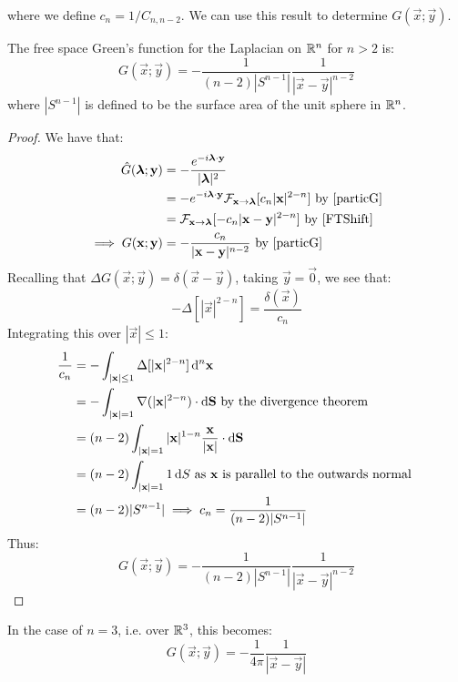 \documentclass[../main.tex]{subfiles}
\begin{document}
where we define $c_n = 1/C_{n, n - 2}$.
We can use this result to determine $G(\vec{x}; \vec{y})$.
\begin{proposition}
  The free space Green's function for the Laplacian on $\mathbb{R}^{n}$ for $n > 2$ is:
  \[
    G(\vec{x}; \vec{y}) = - \frac{1}{(n - 2) |S^{n - 1}|} \frac{1}{|\vec{x} - \vec{y}|^{n - 2}}
  \]
  where $|S^{n - 1}|$ is defined to be the surface area of the unit sphere in $\mathbb{R}^{n}$.
\end{proposition}
\begin{proof}
  We have that:
  \begin{align*}
    \hat{G}(\vec{\lambda}; \vec{y}) &= -\frac{e^{-i \vec{\lambda} \cdot \vec{y}}}{|\vec{\lambda}|^2} \\
                                    &= - e^{-i \vec{\lambda} \cdot \vec{y}} \mathcal{F}_{\vec{x} \to \vec{\lambda}}[c_n |\vec{x}|^{2 - n}] \text{ by \cref{particG}} \\
                                    &= \mathcal{F}_{\vec{x} \to \vec{\lambda}}[-c_n |\vec{x} - \vec{y}|^{2 - n}] \text{ by \cref{FTShift}} \\
    \implies G(\vec{x}; \vec{y}) &= - \frac{c_n}{|\vec{x} - \vec{y}|^{n - 2}} \text{ by \cref{particG}}
  \end{align*}
  Recalling that $\Delta G(\vec{x}; \vec{y}) = \delta(\vec{x} - \vec{y})$, taking $\vec{y} = \vec{0}$, we see that:
  \[
    -\Delta[|\vec{x}|^{2 - n}] = \frac{\delta(\vec{x})}{c_n}
  \]
  Integrating this over $|\vec{x}| \leq 1$:
  \begin{align*}
    \frac{1}{c_n} &= -\int_{|\vec{x}| \leq 1} \Delta[|\vec{x}|^{2 - n}] \d^{n}{\vec{x}} \\
                  &= - \int_{|\vec{x}| = 1} \nabla(|\vec{x}|^{2 - n}) \cdot \d{\vec{S}} \text{ by the divergence theorem} \\
                  &= (n - 2) \int_{|\vec{x}| = 1} |\vec{x}|^{1-n} \frac{\vec{x}}{|\vec{x}|} \cdot \d{\vec{S}} \\
                  &= (n - 2) \int_{|\vec{x}| = 1} 1 \d{S} \text{ as $\vec{x}$ is parallel to the outwards normal } \\
                  &= (n - 2) |S^{n - 1}| \implies c_n = \frac{1}{(n - 2)|S^{n - 1}|}
  \end{align*}
  Thus:
  \[
    G(\vec{x}; \vec{y}) = - \frac{1}{(n - 2) |S^{n - 1}|} \frac{1}{|\vec{x} - \vec{y}|^{n - 2}}
  \]
\end{proof}
In the case of $n = 3$, i.e. over $\mathbb{R}^3$, this becomes:
\begin{equation}
  G(\vec{x}; \vec{y}) = - \frac{1}{4\pi} \frac{1}{|\vec{x} - \vec{y}|} \label{GR3}
\end{equation}
\end{document}
